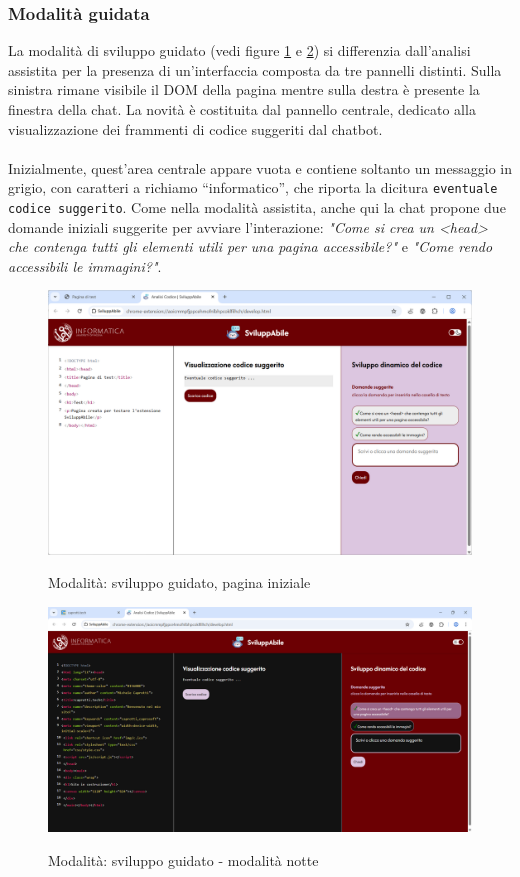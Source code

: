 \subsubsection{Modalità guidata}
\noindent La modalità di sviluppo guidato (vedi figure \ref{fig:mg} e \ref{fig:mg_notte}) si differenzia dall’analisi assistita per la presenza di un’interfaccia composta da tre pannelli distinti. Sulla sinistra rimane visibile il DOM della pagina mentre sulla destra è presente la finestra della chat. La novità è costituita dal pannello centrale, dedicato alla visualizzazione dei frammenti di codice suggeriti dal chatbot.\\
\\
Inizialmente, quest’area centrale appare vuota e contiene soltanto un messaggio in grigio, con caratteri a richiamo “informatico”, che riporta la dicitura \texttt{eventuale codice suggerito}. Come nella modalità assistita, anche qui la chat propone due domande iniziali suggerite per avviare l’interazione: \textit{"Come si crea un <head> che contenga tutti gli elementi utili per una pagina accessibile?"} e \textit{"Come rendo accessibili le immagini?"}.\\

\begin{figure}[H]
    \centering
    \includegraphics[width=1\linewidth, alt={Modalità di sviluppo guidato}]{img/mg.png}
    \caption{Modalità: sviluppo guidato, pagina iniziale}\label{fig:mg}
\end{figure}

\begin{figure}[H]
    \centering
    \includegraphics[width=1\linewidth, alt={Modalità di sviluppo guidato}]{img/mg_dark.png}
    \caption{Modalità: sviluppo guidato - modalità notte}\label{fig:mg_notte}
\end{figure}

